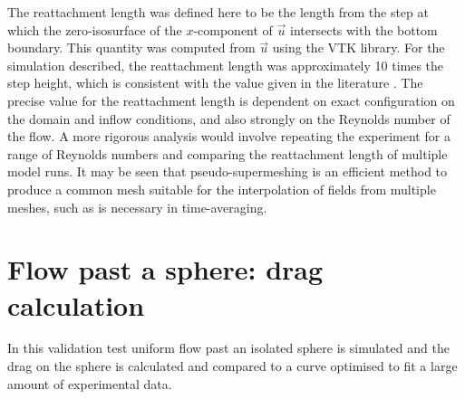 The reattachment length was defined here to be the length
from the step at which the zero-isosurface of the $x$-component of $\vec{u}$ intersects with
the bottom boundary. This quantity was computed from $\vec{u}$
using the VTK library. For the simulation described, the reattachment
length was approximately 10 times the step height, which is consistent with the value
given in the literature \cite{le1997}.
The precise value for the reattachment length is dependent on exact configuration on the domain and inflow
conditions, and also strongly on the Reynolds number of the flow.
A more rigorous analysis would involve
repeating the experiment for a range of Reynolds numbers and comparing the reattachment
length of multiple model runs. It may be seen that pseudo-supermeshing is an efficient
method to produce a common mesh suitable for the interpolation of fields from multiple
meshes, such as is necessary in time-averaging.






\section{Flow past a sphere: drag calculation}

In this validation test uniform flow past an isolated sphere is simulated
and the drag on the sphere is calculated and compared to a curve optimised
to fit a large amount of experimental data.

